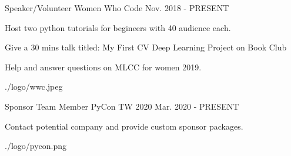 

\begin{cventries}

  \cventry
    {Speaker/Volunteer} %
    {Women Who Code} %
    {} %
    {Nov. 2018 - PRESENT} %
    {
      \begin{cvitems} %
        \item {Host two python tutorials for begineers with 40 audience each.}
        \item {Give a 30 mins talk titled: My First CV Deep Learning Project on Book Club}
        \item {Help and answer questions on MLCC for women 2019.}
      \end{cvitems}
    }
    {./logo/wwc.jpeg}

  \cventry
    {Sponsor Team Member} %
    {PyCon TW 2020} %
    {} %
    {Mar. 2020 - PRESENT} %
    {
      \begin{cvitems} %
        \item {Contact potential company and provide custom sponsor packages.}
      \end{cvitems}
    }
    {./logo/pycon.png}
\end{cventries}
